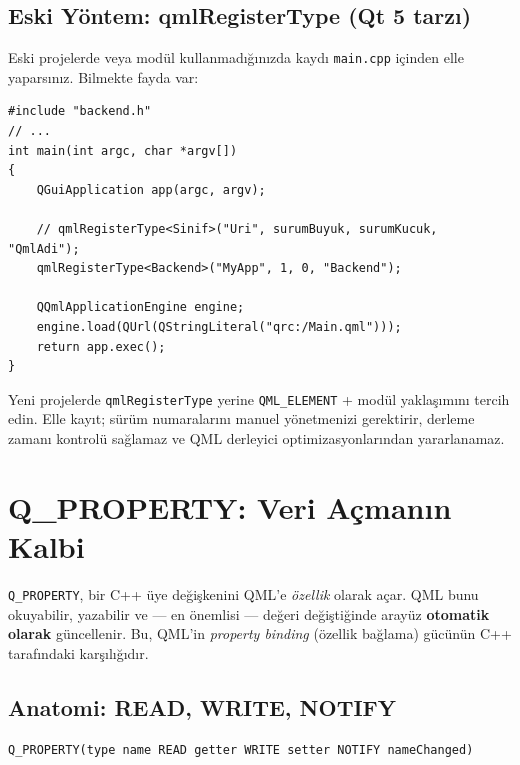 \documentclass[11pt,a4paper]{article}
\newcommand{\kod}[1]{\texttt{\color{koyuGri}#1}}
\begin{document}
\subsection{Eski Yöntem: qmlRegisterType (Qt 5 tarzı)}

Eski projelerde veya modül kullanmadığınızda kaydı \kod{main.cpp} içinden
elle yaparsınız. Bilmekte fayda var:

\begin{lstlisting}
#include "backend.h"
// ...
int main(int argc, char *argv[])
{
    QGuiApplication app(argc, argv);

    // qmlRegisterType<Sinif>("Uri", surumBuyuk, surumKucuk, "QmlAdi");
    qmlRegisterType<Backend>("MyApp", 1, 0, "Backend");

    QQmlApplicationEngine engine;
    engine.load(QUrl(QStringLiteral("qrc:/Main.qml")));
    return app.exec();
}
\end{lstlisting}

\begin{uyarikutu}
Yeni projelerde \kod{qmlRegisterType} yerine \kod{QML\_ELEMENT} + modül
yaklaşımını tercih edin. Elle kayıt; sürüm numaralarını manuel yönetmenizi
gerektirir, derleme zamanı kontrolü sağlamaz ve QML derleyici
optimizasyonlarından yararlanamaz.
\end{uyarikutu}

\section{Q\_PROPERTY: Veri Açmanın Kalbi}

\kod{Q\_PROPERTY}, bir C++ üye değişkenini QML'e \emph{özellik} olarak açar.
QML bunu okuyabilir, yazabilir ve — en önemlisi — değeri değiştiğinde arayüz
\textbf{otomatik olarak} güncellenir. Bu, QML'in \emph{property binding}
(özellik bağlama) gücünün C++ tarafındaki karşılığıdır.

\subsection{Anatomi: READ, WRITE, NOTIFY}

\begin{lstlisting}
Q_PROPERTY(type name READ getter WRITE setter NOTIFY nameChanged)
\end{lstlisting}
\end{document}
